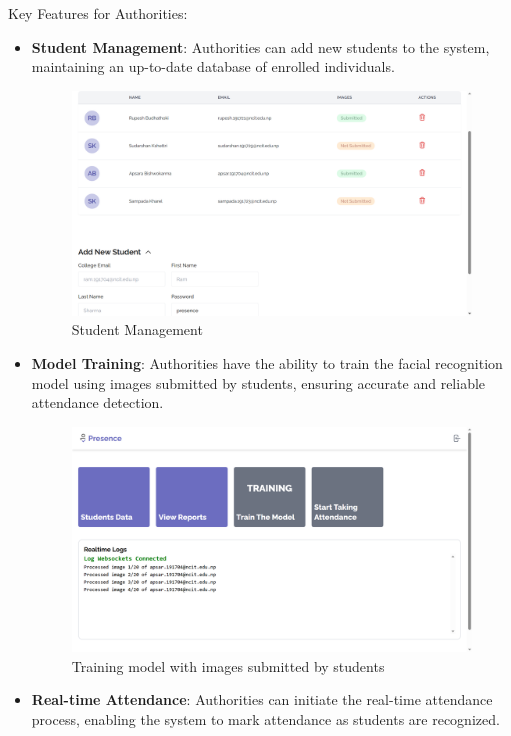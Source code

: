 Key Features for Authorities:
\begin{itemize} 
\item \textbf{Student Management}: Authorities can add new students to the system, maintaining an up-to-date database of enrolled individuals.
\begin{figure}[H]
    \includegraphics[width=\linewidth]{figures/students-list.png}
    \centering
    \caption{Student Management}
\end{figure}
\item \textbf{Model Training}: Authorities have the ability to train the facial recognition model using images submitted by students, ensuring accurate and reliable attendance detection.
\begin{figure}[H]
    \includegraphics[width=\linewidth]{figures/training.png}
    \centering
    \caption{Training model with images submitted by students}
\end{figure}
\item \textbf{Real-time Attendance}: Authorities can initiate the real-time attendance process, enabling the system to mark attendance as students are recognized.

\end{itemize}
